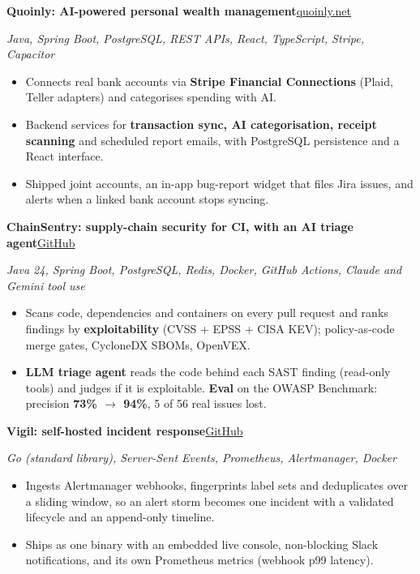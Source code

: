\documentclass[10pt, letterpaper]{article}
\newenvironment{highlights}{
    \begin{itemize}[
        topsep=0.06 cm,
        parsep=0.04 cm,
        partopsep=0pt,
        itemsep=0pt,
        leftmargin=0.4 cm
    ]
}{
    \end{itemize}
}
\newcommand{\entry}[2]{\textbf{#1}\hfill{#2}\par}
\newcommand{\sub}[1]{{\small\textit{#1}}\par}
\begin{document}
    \entry{Quoinly: AI-powered personal wealth management}{\small\href{https://quoinly.net}{quoinly.net}}
    \sub{Java, Spring Boot, PostgreSQL, REST APIs, React, TypeScript, Stripe, Capacitor}
    \begin{highlights}
        \item Connects real bank accounts via \textbf{Stripe Financial Connections} (Plaid, Teller adapters) and
              categorises spending with AI.
        \item Backend services for \textbf{transaction sync, AI categorisation, receipt scanning} and scheduled report
              emails, with PostgreSQL persistence and a React interface.
        \item Shipped joint accounts, an in-app bug-report widget that files Jira issues, and alerts when a linked
              bank account stops syncing.
    \end{highlights}

    \vspace{0.12 cm}
    \entry{ChainSentry: supply-chain security for CI, with an AI triage agent}{\small\href{https://github.com/vandan08/chainsentry}{GitHub}}
    \sub{Java 24, Spring Boot, PostgreSQL, Redis, Docker, GitHub Actions, Claude and Gemini tool use}
    \begin{highlights}
        \item Scans code, dependencies and containers on every pull request and ranks findings by
              \textbf{exploitability} (CVSS + EPSS + CISA KEV); policy-as-code merge gates, CycloneDX SBOMs, OpenVEX.
        \item \textbf{LLM triage agent} reads the code behind each SAST finding (read-only tools) and judges if it is
              exploitable. \textbf{Eval} on the OWASP Benchmark: precision \textbf{73\% $\rightarrow$ 94\%}, 5 of 56 real
              issues lost.
    \end{highlights}

    \vspace{0.12 cm}
    \entry{Vigil: self-hosted incident response}{\small\href{https://github.com/vandan08/Vigil-}{GitHub}}
    \sub{Go (standard library), Server-Sent Events, Prometheus, Alertmanager, Docker}
    \begin{highlights}
        \item Ingests Alertmanager webhooks, fingerprints label sets and deduplicates over a sliding window, so an
              alert storm becomes one incident with a validated lifecycle and an append-only timeline.
        \item Ships as one binary with an embedded live console, non-blocking Slack notifications, and its own
              Prometheus metrics (webhook p99 latency).
    \end{highlights}
\end{document}
